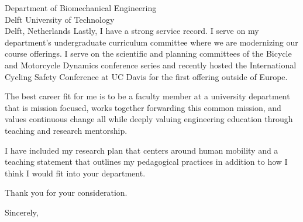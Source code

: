 \documentclass{letter}
\begin{document}
\begin{letter}{
  Department of Biomechanical Engineering \\
  Delft University of Technology \\
  Delft, Netherlands
}
Lastly, I have a strong service record. I serve on my department's
undergraduate curriculum committee where we are modernizing our course
offerings. I serve on the scientific and planning committees of the Bicycle and
Motorcycle Dynamics conference series and recently hosted the International
Cycling Safety Conference at UC Davis for the first offering outside of Europe.

The best career fit for me is to be a faculty member at a university department
that is mission focused, works together forwarding this common mission, and
values continuous change all while deeply valuing engineering education through
teaching and research mentorship.


I have included my research plan that centers around human mobility and a
teaching statement that outlines my pedagogical practices in addition to how I
think I would fit into your department.

Thank you for your consideration.

\closing{Sincerely,}

\end{letter}
\end{document}
